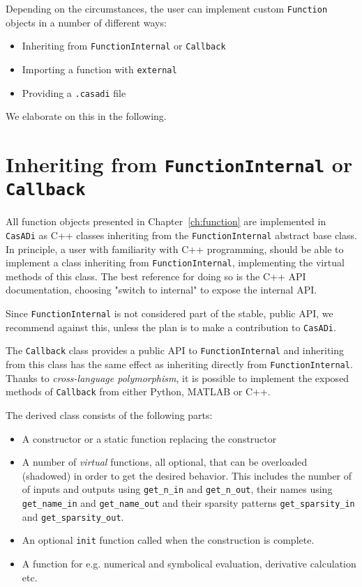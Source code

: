 \documentclass[a4paper,12pt]{book}
\newcommand{\CasADi}{\texttt{CasADi}\xspace}
\begin{document}
Depending on the circumstances, the user can implement custom \texttt{Function}
objects in a number of different ways:

\begin{itemize}
\item Inheriting from \texttt{FunctionInternal} or \texttt{Callback}
\item Importing a function with \texttt{external}
\item Providing a \texttt{.casadi} file
\end{itemize}

We elaborate on this in the following.
\section{Inheriting from \texttt{FunctionInternal} or \texttt{Callback}}
All function objects presented in Chapter~\ref{ch:function} are implemented
in \CasADi as C++ classes inheriting from the \texttt{FunctionInternal} abstract
base class. In principle, a user with familiarity with C++ programming, should
be able to implement a class inheriting from \texttt{FunctionInternal},
implementing the virtual methods of this class. The best reference for doing so
is the C++ API documentation, choosing "switch to internal" to expose the internal
API.

Since \texttt{FunctionInternal} is not considered part of the stable, public API,
we recommend against this, unless the plan is to make a contribution to \CasADi.

The \texttt{Callback} class provides a public API to \texttt{FunctionInternal}
and inheriting from this class has the same effect as inheriting directly from
\texttt{FunctionInternal}. Thanks to \emph{cross-language polymorphism}, it
is possible to implement the exposed methods of \texttt{Callback} from either
Python, MATLAB or C++.

The derived class consists of the following parts:
\begin{itemize}
  \item A constructor or a static function replacing the constructor
  \item A number of \emph{virtual} functions, all optional, that can be overloaded
  (shadowed) in order to get the desired behavior. This includes the number of
  of inputs and outputs using \verb|get_n_in| and \verb|get_n_out|,
  their names using \verb|get_name_in| and \verb|get_name_out|
  and their sparsity patterns \verb|get_sparsity_in| and \verb|get_sparsity_out|.
  \item An optional \verb|init| function called when the construction is complete.
  \item A function for e.g. numerical and symbolical evaluation, derivative
  calculation etc.
\end{itemize}
\end{document}
